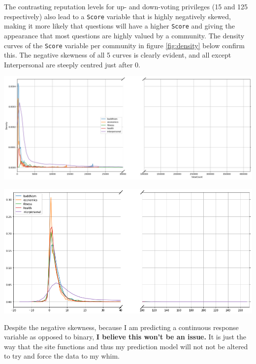 \documentclass[11pt,preprint, authoryear]{article}
\let\origfigure\figure
\let\endorigfigure\endfigure
\renewenvironment{figure}[1][2] {
    \expandafter\origfigure\expandafter[H]
} {
    \endorigfigure
}
\numberwithin{equation}{section}
\begin{document}
The contrasting reputation levels for up- and down-voting privileges (15
and 125 respectively) also lead to a \texttt{Score} variable that is
highly negatively skewed, making it more likely that questions will have
a higher \texttt{Score} and giving the appearance that most questions
are highly valued by a community. The density curves of the
\texttt{Score} variable per community in figure \ref{fig:density} below
confirm this. The negative skewness of all 5 curves is clearly evident,
and all except Interpersonal are steeply centred just after 0.

\footnotesize

\begin{figure}
\caption{\textbf{Density Plots}}
\label{fig:density}

\begin{center}\includegraphics[width=0.8\linewidth]{../../01-python-code/00-workspace/01-graphs/views-density-plot} \end{center}



\begin{center}\includegraphics[width=0.8\linewidth]{../../01-python-code/00-workspace/01-graphs/score-density-plot} \end{center}
\end{figure}

\normalsize

Despite the negative skewness, because I am predicting a continuous
response variable as opposed to binary, \textbf{I believe this won't be
an issue.} It is just the way that the site functions and thus my
prediction model will not not be altered to try and force the data to my
whim.
\end{document}
